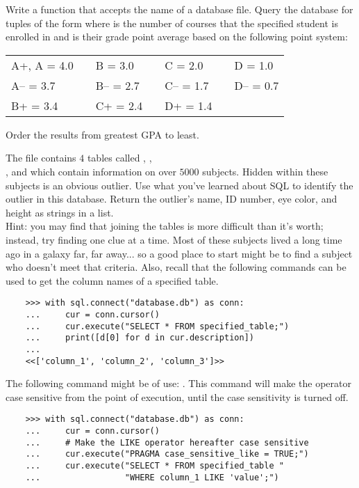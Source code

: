 \begin{problem} %
Write a function that accepts the name of a database file.
Query the database for tuples of the form  where  is the number of courses that the specified student is enrolled in and  is their grade point average based on the following point system:

\begin{center}
\begin{tabular}{lclclcl}
A+, A   = 4.0 & & B   = 3.0 & & C   = 2.0 & & D   = 1.0 \\
    A-- = 3.7 & & B-- = 2.7 & & C-- = 1.7 & & D-- = 0.7 \\
    B+  = 3.4 & & C+  = 2.4 & & D+  = 1.4 & &
\end{tabular}
\end{center}
Order the results from greatest GPA to least.
\end{problem}


\begin{problem} %
    The file  contains $4$ tables called , , 
    \\ , and  which contain information on over $5000$ subjects.
    Hidden within these subjects is an obvious outlier.
    Use what you've learned about SQL to identify the outlier in this database.
    Return the outlier's name, ID number, eye color, and height as strings in a list.
    \\
    \noindent Hint: you may find that joining the tables is more difficult than it's worth; instead, try finding one clue at a time.
    Most of these subjects lived a long time ago in a galaxy far, far away... so a good place to start might be to find a subject who doesn't meet that criteria.
    Also, recall that the following commands can be used to get the column names of a specified table.
    
    \begin{lstlisting}
    >>> with sql.connect("database.db") as conn:
    ...     cur = conn.cursor()
    ...     cur.execute("SELECT * FROM specified_table;")
    ...     print([d[0] for d in cur.description])
    ...
    <<['column_1', 'column_2', 'column_3']>>
    \end{lstlisting}

    The following command might be of use: .
    This command will make the  operator case sensitive from the point of execution,
    until the case sensitivity is turned off.

    \begin{lstlisting}
    >>> with sql.connect("database.db") as conn:
    ...     cur = conn.cursor()
    ...     # Make the LIKE operator hereafter case sensitive
    ...     cur.execute("PRAGMA case_sensitive_like = TRUE;")
    ...     cur.execute("SELECT * FROM specified_table "
    ...                 "WHERE column_1 LIKE 'value';")

    \end{lstlisting}

\end{problem}


